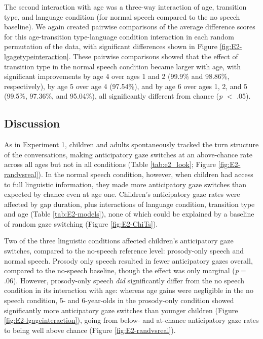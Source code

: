 \documentclass[authoryear, 12pt]{elsarticle}
\begin{document}
The second interaction with age was a three-way interaction of age, transition type, and language condition (for normal speech compared to the no speech baseline). We again created pairwise comparisons of the average difference scores for this age-transition type-language condition interaction in each random permutation of the data, with significant differences shown in Figure \ref{fig:E2-lgagetypeinteraction}. These pairwise comparisons showed that the effect of transition type in the normal speech condition became larger with age, with significant improvements by age 4 over ages 1 and 2 (99.9\% and 98.86\%, respectively), by age 5 over age 4 (97.54\%), and by age 6 over ages 1, 2, and 5 (99.5\%, 97.36\%, and 95.04\%), all significantly different from chance (\textit{p} $<$ .05).

\subsection{Discussion}
\label{sec:discussion2}
As in Experiment 1, children and adults spontaneously tracked the turn structure of the conversations, making anticipatory gaze switches at an above-chance rate across all ages but not in all conditions (Table \ref{tab:e2_look}; Figure \ref{fig:E2-randvsreal}). In the normal speech condition, however, when children had access to full linguistic information, they made more anticipatory gaze switches than expected by chance even at age one. Children's anticipatory gaze rates were affected by gap duration, plus interactions of language condition, transition type and age (Table \ref{tab:E2-models}), none of which could be explained by a baseline of random gaze switching (Figure \ref{fig:E2-ChiTs}).

Two of the three linguistic conditions affected children's anticipatory gaze switches, compared to the no-speech reference level: prosody-only speech and normal speech. Prosody only speech resulted in fewer anticipatory gazes overall, compared to the no-speech baseline, though the effect was only marginal (\textit{p}$=$.06). However, prosody-only speech \textit{did} significantly differ from the no speech condition in its interaction with age: whereas age gains were negligible in the no speech condition, 5- and 6-year-olds in the prosody-only condition showed significantly more anticipatory gaze switches than younger children (Figure \ref{fig:E2-lgageinteraction}), going from below- and at-chance anticipatory gaze rates to being well above chance (Figure \ref{fig:E2-randvsreal}).
\end{document}
